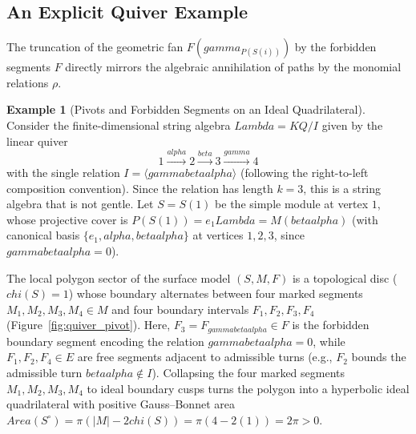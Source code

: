\documentclass[11pt,a4paper,reqno]{amsart}
\def\mathcal#1{#1}%
\def\mathbb#1{#1}%
\def\operatorname#1{#1}%
\def\K{K}%
\def\forb{F}%
\def\gamma{gamma}%
\def\alpha{alpha}%
\def\beta{beta}%
\def\chi{chi}%
\def\Lambda{Lambda}%
\theoremstyle{definition}
\newtheorem{example}[theorem]{Example}
\theoremstyle{remark}
\newcommand{\K}{\mathbb{K}}
\newcommand{\forb}{\mathfrak{F}}
\begin{document}
\subsection{An Explicit Quiver Example}
\label{subsec:quiver_example}

The truncation of the geometric fan $\mathcal{F}(\gamma_{P(S(i))})$ by the forbidden segments $\forb$ directly mirrors the algebraic annihilation of paths by the monomial relations $\rho$.

\begin{example}[Pivots and Forbidden Segments on an Ideal Quadrilateral]
\label{ex:quiver_pivot}
Consider the finite-dimensional string algebra $\Lambda = \K\mathcal{Q}/I$ given by the linear quiver
\[
1 \xrightarrow{\alpha} 2 \xrightarrow{\beta} 3 \xrightarrow{\gamma} 4
\]
with the single relation $I = \langle \gamma\beta\alpha \rangle$ (following the right-to-left composition convention). Since the relation has length $k=3$, this is a string algebra that is not gentle. Let $S = S(1)$ be the simple module at vertex $1$, whose projective cover is $P(S(1)) = e_1\Lambda = M(\beta\alpha)$ (with canonical basis $\{e_1, \alpha, \beta\alpha\}$ at vertices $1, 2, 3$, since $\gamma\beta\alpha = 0$).

The local polygon sector of the surface model $(\mathcal{S}, \mathcal{M}, \forb)$ is a topological disc ($\chi(\mathcal{S}) = 1$) whose boundary alternates between four marked segments $M_1, M_2, M_3, M_4 \in \mathcal{M}$ and four boundary intervals $F_1, F_2, F_3, F_4$ (Figure~\ref{fig:quiver_pivot}). Here, $F_3 = F_{\gamma\beta\alpha} \in \forb$ is the forbidden boundary segment encoding the relation $\gamma\beta\alpha = 0$, while $F_1, F_2, F_4 \in \mathcal{E}$ are free segments adjacent to admissible turns (e.g., $F_2$ bounds the admissible turn $\beta\alpha \notin I$). Collapsing the four marked segments $M_1, M_2, M_3, M_4$ to ideal boundary cusps turns the polygon into a hyperbolic ideal quadrilateral with positive Gauss--Bonnet area $\operatorname{Area}(\mathcal{S}^\circ) = \pi(|\mathcal{M}| - 2\chi(\mathcal{S})) = \pi(4 - 2(1)) = 2\pi > 0$.


\end{example}
\end{document}
